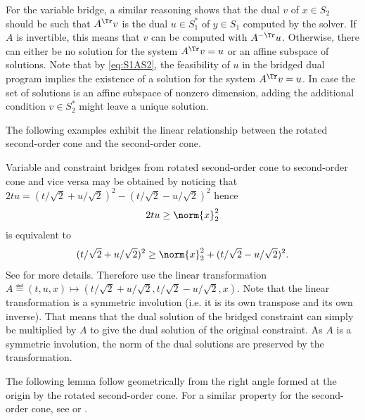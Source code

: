 \documentclass[11pt,twoside,a4paper,openright]{uclouvain-thesis}
\begin{document}
For the variable bridge, a similar reasoning shows that the dual $v$ of $x \in S_2$
should be such that $A^\Tr v$ is the dual $u \in S_1^*$ of $y \in S_1$ computed by the solver.
If $A$ is invertible, this means that $v$ can be computed with $A^{-\Tr} u$.
Otherwise, there can either be no solution for the system $A^\Tr v = u$ or an affine subspace of solutions.
Note that by \eqref{eq:S1AS2}, the feasibility of $u$ in the bridged dual program implies the existence of a solution for the system $A^\Tr v = u$.
In case the set of solutions is an affine subspace of nonzero dimension, adding the additional condition $v \in S_2^*$ might leave a unique solution.

The following examples exhibit the linear relationship between the rotated second-order cone and the second-order cone.

\begin{myexem}
  \label{exem:rsoc}
  Variable and constraint bridges from rotated second-order cone to second-order cone
  and vice versa may be obtained by noticing that $2tu = (t/\sqrt{2} + u/\sqrt{2})^2 - (t/\sqrt{2} - u/\sqrt{2})^2$ hence
  \[
    2tu \ge \norm{x}_2^2
  \]
  is equivalent to
  \[
    (t/\sqrt{2} + u/\sqrt{2})^2 \ge \norm{x}_2^2 + (t/\sqrt{2} - u/\sqrt{2})^2.
  \]
  See \cite[p.~104]{ben2001lectures} for more details.
  Therefore use the linear transformation $A \eqdef (t, u, x) \mapsto (t/\sqrt{2}+u/\sqrt{2}, t/\sqrt{2}-u/\sqrt{2}, x)$.
  Note that the linear transformation is a symmetric involution (i.e. it is its own transpose and its own inverse).
  That means that the dual solution of the bridged constraint can simply be multiplied
  by $A$ to give the dual solution of the original constraint.
  As $A$ is a symmetric involution, the norm of the dual solutions are preserved by the transformation.
\end{myexem}

The following lemma follow geometrically from the right angle formed at the origin
by the rotated second-order cone.
For a similar property for the second-order cone, see  or \cite[Fact~1]{fawzi2018representing}.
\end{document}
